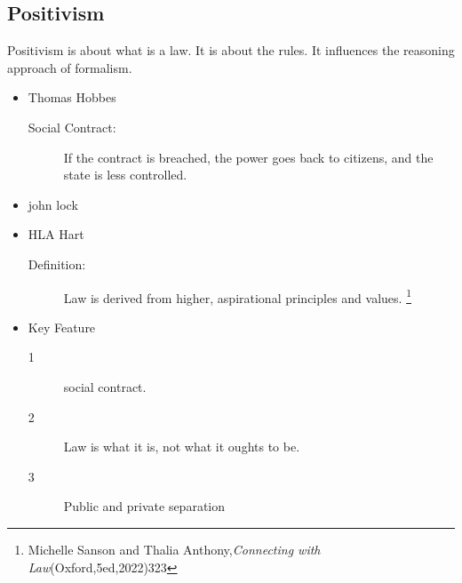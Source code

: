 \subsection*{Positivism}
Positivism is about what is a law. It is about the rules. It influences the reasoning approach of formalism. 
\begin{itemize}
    \item Thomas Hobbes 
        \begin{description}
            \item[Social Contract:] If the contract is breached, the power goes back to citizens, and the state is less controlled. 
        \end{description}
    \item john lock
    \item HLA Hart
        \begin{description}
            \item[Definition:] Law is derived from higher, aspirational principles and values. \footnote{Michelle Sanson and Thalia Anthony,\textit{Connecting with Law}(Oxford,5ed,2022)323}
        \end{description}
    \item Key Feature
        \begin{description}
            \item[1] social contract. 
            \item[2] Law is what it is, not what it oughts to be. 
            \item[3] Public and private separation
        \end{description}
\end{itemize}



